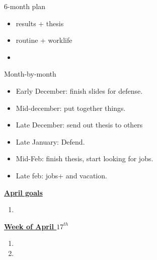 \documentclass[serif, mathserif, final]{beamer}
\begin{document}
{\begin{frame}{}
\begin{columns}
\begin{column}{0.5\linewidth}
    \begin{block}{ 6-month plan}
      \begin{itemize}
        \small \item \small results + thesis
      \item \small routine + worklife
      \item \small 
      \end{itemize}
    \end{block} 

    \begin{block}{Month-by-month}
      \begin{itemize}
      \item \small Early December: finish slides for defense.
      \item \small Mid-december: put together things. 
      \item \small Late December: send out thesis to others 
      \item \small Late January: Defend.
      \item \small Mid-Feb: finish thesis, start looking for jobs. 
      \item \small Late feb: jobs+ and vacation. 
      \end{itemize}
    \end{block}

\begin{block}{\underline{\textbf{April goals}}}
\begin{enumerate}
\small \item \small 
\end{enumerate}
\end{block}

\begin{block}{\small \underline{\textbf{Week of April $17^{th}$}}}
\begin{enumerate}
\tiny \item \tiny 
\item \tiny 
\end{enumerate}
\end{block}
\end{column}




\end{columns}
\end{frame}}
\end{document}
